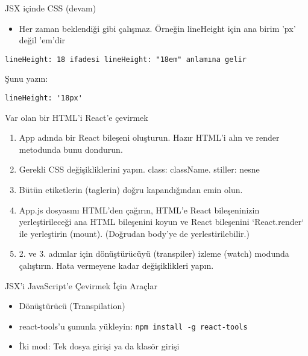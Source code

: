 \documentclass[presentation]{beamer}
\begin{document}
\begin{frame}[fragile,label={sec:org9bb06f2}]{JSX içinde CSS (devam)}
 \begin{itemize}
\item Her zaman beklendiği gibi çalışmaz. Örneğin lineHeight için ana birim 'px'
değil 'em'dir
\end{itemize}
\begin{verbatim}
lineHeight: 18 ifadesi lineHeight: "18em" anlamına gelir
\end{verbatim}

Şunu yazın:
\begin{verbatim}
lineHeight: '18px'
\end{verbatim}
\end{frame}

\begin{frame}[label={sec:org71d6b0a}]{Var olan bir HTML'i React'e çevirmek}
\begin{enumerate}
\item App adında bir React bileşeni oluşturun. Hazır HTML'i alın ve render
metodunda bunu dondurun.

\item Gerekli CSS değişikliklerini yapın. class: className. stiller: nesne

\item Bütün etiketlerin (taglerin) doğru kapandığından emin olun.

\item App.js dosyasını HTML'den çağırın, HTML'e React bileşeninizin
yerleştirileceği ana HTML bileşenini koyun ve React bileşenini `React.render`
ile yerleştirin (mount). (Doğrudan body'ye de yerlestirilebilir.)

\item 2. ve 3. adımlar için dönüştürücüyü (transpiler) izleme (watch) modunda
çalıştırın. Hata vermeyene kadar değişiklikleri yapın.
\end{enumerate}
\end{frame}

\begin{frame}[fragile,label={sec:org4f8dce8}]{JSX'i JavaScript'e Çevirmek İçin Araçlar}
 \begin{itemize}
\item Dönüştürücü (Transpilation)
\item \alert{react-tools}'u şununla yükleyin: \texttt{npm install -g react-tools}
\item İki mod: Tek dosya girişi  ya da klasör girişi
\end{itemize}
\end{frame}
\end{document}
